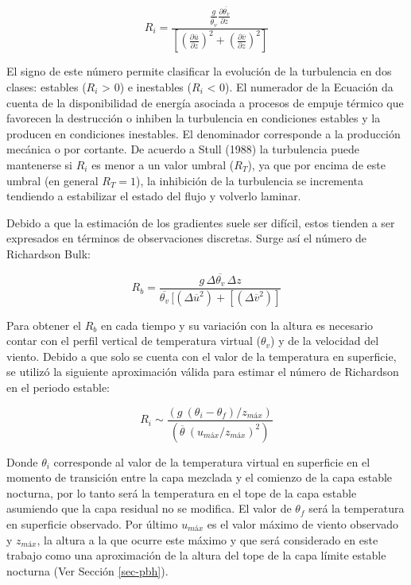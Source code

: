 \documentclass[12pt,spanish,oneside, a4paper]{book}
\begin{document}
\begin{equation} \label{eq-ri1}
R_i = \frac{\frac{g}{\overline{\theta_v}} \frac{\partial \overline{\theta_v}}{\partial z}}
{\left [ \left (\frac{\partial \overline{u}}{\partial z} \right )^2 + \left (\frac{\partial \overline{v}}{\partial z} \right )^2  \right]}
\end{equation}

El signo de este número permite clasificar la evolución de la
turbulencia en dos clases: estables (\(R_i\) \textgreater{} 0) e
inestables (\(R_i\) \textless{} 0). El numerador de la Ecuación da
cuenta de la disponibilidad de energía asociada a procesos de empuje
térmico que favorecen la destrucción o inhiben la turbulencia en
condiciones estables y la producen en condiciones inestables. El
denominador corresponde a la producción mecánica o por cortante. De
acuerdo a Stull (1988) la turbulencia puede mantenerse si \(R_i\) es
menor a un valor umbral (\(R_T\)), ya que por encima de este umbral (en
general \(R_T = 1\)), la inhibición de la turbulencia se incrementa
tendiendo a estabilizar el estado del flujo y volverlo laminar.

Debido a que la estimación de los gradientes suele ser difícil, estos
tienden a ser expresados en términos de observaciones discretas. Surge
así el número de Richardson Bulk:

\begin{equation} \label{eq-ri2}
R_b = \frac{g \, \Delta \overline{\theta_v} \, \Delta z}{\overline{\theta_v} \, [(\Delta \overline{u}^2) + [(\Delta \overline{v}^2)]}
\end{equation}

Para obtener el \(R_b\) en cada tiempo y su variación con la altura es
necesario contar con el perfil vertical de temperatura virtual
(\(\theta_v\)) y de la velocidad del viento. Debido a que solo se cuenta
con el valor de la temperatura en superficie, se utilizó la siguiente
aproximación válida para estimar el número de Richardson en el periodo
estable:

\begin{equation} \label{eq-ri3}
R_i \sim \frac{(g  \: (\theta_i - \theta_f)/z_{máx})}{(\overline{\theta} \: (u_{máx}/z_{máx})^2)}
\end{equation}

Donde \(\theta_i\) corresponde al valor de la temperatura virtual en
superficie en el momento de transición entre la capa mezclada y el
comienzo de la capa estable nocturna, por lo tanto será la temperatura
en el tope de la capa estable asumiendo que la capa residual no se
modifica. El valor de \(\theta_f\) será la temperatura en superficie
observado. Por último \(u_{máx}\) es el valor máximo de viento observado
y \(z_{máx}\), la altura a la que ocurre este máximo y que será
considerado en este trabajo como una aproximación de la altura del tope
de la capa límite estable nocturna (Ver Sección \ref{sec-pbh}).
\end{document}
